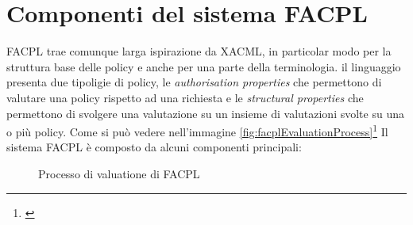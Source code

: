 \section{Componenti del sistema FACPL}
\label{sec:componentiFACPL}
FACPL trae comunque larga ispirazione da XACML, in particolar modo per la struttura base delle policy e anche per una parte della terminologia. il linguaggio presenta due tipoligie di policy, le \emph{authorisation properties} che permettono di valutare una policy rispetto ad una richiesta e le \emph{structural properties} che permettono di svolgere una valutazione su un insieme di valutazioni svolte su una o più policy.
Come si può vedere nell'immagine \ref{fig:facplEvaluationProcess}\footnote{\cite{facpl}} Il sistema FACPL è composto da alcuni componenti principali:
\begin{figure}[h]
    \centering
    
    \caption{Processo di valuatione di FACPL}
  \end{figure}
\label{fig:facplEvaluationProcess}
